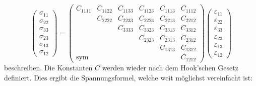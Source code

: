 \[
\begin{pmatrix}
	\sigma_{11} \\
	\sigma_{22} \\
	\sigma_{33} \\
	\sigma_{23} \\
	\sigma_{13} \\
	\sigma_{12}
\end{pmatrix}
=
\begin{pmatrix}
	  C_{1111} & C_{1122} & C_{1133} & C_{1123} & C_{1113} & C_{1112} \\
	           & C_{2222} & C_{2233} & C_{2223} & C_{2213} & C_{2212} \\
	           &          & C_{3333} & C_{3323} & C_{3313} & C_{3312} \\ 
	           &          &          & C_{2323} & C_{2313} & C_{2312} \\ 
               &          &          &          & C_{1313} & C_{1312} \\
    \text{sym} &          &          &          &          & C_{1212} 
\end{pmatrix}
\begin{pmatrix}
	\varepsilon_{11} \\
	\varepsilon_{22} \\
	\varepsilon_{33} \\
	\varepsilon_{23} \\
	\varepsilon_{13} \\
	\varepsilon_{12}
\end{pmatrix}
\]
beschreiben.
Die Konstanten $C$ werden wieder nach dem Hook'schen Gesetz definiert.
Dies ergibt die Spannungsformel, welche weit möglichst vereinfacht ist:
